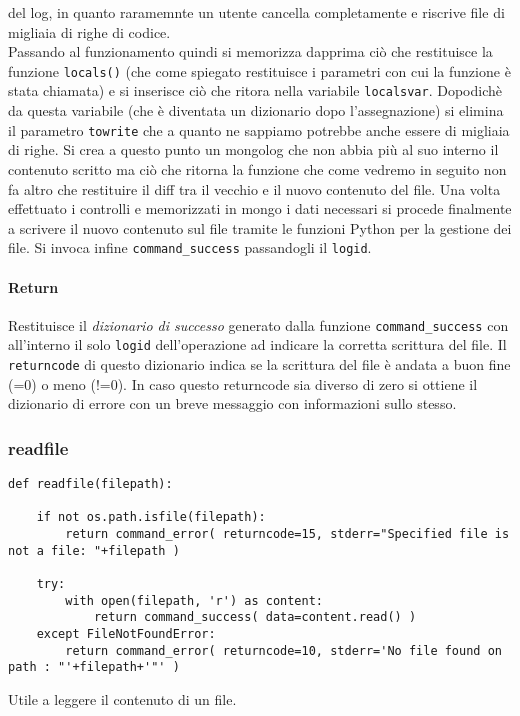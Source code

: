 \documentclass[11pt]{article}
\begin{document}
del log, in quanto raramemnte un utente cancella completamente e riscrive file di migliaia di righe di codice. \\
Passando al funzionamento quindi si memorizza dapprima ciò che restituisce la funzione \texttt{locals()} (che come spiegato
restituisce i parametri con cui la funzione è stata chiamata) e si inserisce ciò che ritora nella variabile \texttt{localsvar}.
Dopodichè da questa variabile (che è diventata un dizionario dopo l'assegnazione) si elimina il parametro \texttt{towrite}
che a quanto ne sappiamo potrebbe anche essere di migliaia di righe.
Si crea a questo punto un mongolog che non abbia più al suo interno il contenuto scritto ma ciò che ritorna la funzione
 che come vedremo in seguito non fa altro che restituire il diff tra il vecchio e il nuovo contenuto del file.
Una volta effettuato i controlli e memorizzati in mongo i dati necessari si procede finalmente a scrivere il nuovo contenuto sul file
tramite le funzioni Python per la gestione dei file. Si invoca infine \texttt{command\string_success} passandogli il \texttt{logid}.
\paragraph{Return}
Restituisce il \textit{dizionario di successo} generato dalla funzione \texttt{command\string_success} con all'interno
il solo \texttt{logid} dell'operazione ad indicare la corretta scrittura del file.
Il \texttt{returncode} di questo dizionario indica se la scrittura del file è andata a buon fine (=0) o meno (!=0).
In caso questo returncode sia diverso di zero si ottiene il dizionario di errore con un breve messaggio con informazioni
sullo stesso.

\subsubsection{readfile}\label{readfile}
\begin{lstlisting}
def readfile(filepath):

    if not os.path.isfile(filepath):
        return command_error( returncode=15, stderr="Specified file is not a file: "+filepath )

    try:
        with open(filepath, 'r') as content:
            return command_success( data=content.read() )
    except FileNotFoundError:
        return command_error( returncode=10, stderr='No file found on path : "'+filepath+'"' )
\end{lstlisting}
Utile a leggere il contenuto di un file.
\end{document}
